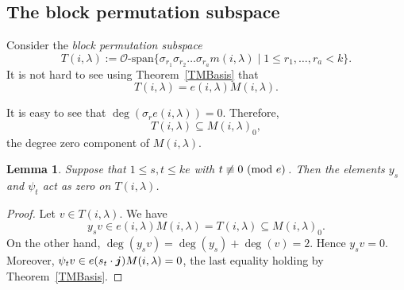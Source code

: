 \documentclass[twoside,11pt,reqno]{amsart}
\numberwithin{equation}{section}
\newtheorem{Lemma}[equation]{Lemma}
\theoremstyle{definition}  %
\newcommand\Comment[2][\relax]{\space\par\medskip\noindent%
   \fbox{\begin{minipage}{\textwidth}\textbf{Comment\ifx\relax#1\else---#1\fi}\newline%
        #2\end{minipage}}\medskip
}
\def\bj{\text{\boldmath$j$}}
\def\bs{\text{\boldmath$s$}}
\def\pmod#1{\text{ }(\text{\rm mod } #1)\,}
\newcommand{\End}{\operatorname{End}}
\newcommand{\0}{{\bar 0}}
\newcommand{\1}{{\bar 1}}
\newcommand{\la}{\lambda}
\newcommand{\si}{\sigma}
\newcommand{\de}{\delta}
\renewcommand\O{\mathcal O}
\begin{document}

\subsection{\boldmath The block permutation subspace}\label{SSBlPermSp}
Consider the {\em block permutation subspace} 
$$
T(i,\la):=\O\text{-span}\{\si_{r_1}\si_{r_2}\dots\si_{r_a}m(i,\la)\mid 1\le r_1,\dots,r_a<k\}.
$$
It is not hard to see using Theorem~\ref{TMBasis} that 
$$
T(i,\la)= e(i,\la)M(i,\la).
$$

%
It is easy to see that $\deg(\si_re(i,\la))=0$. Therefore, 
$$T(i,\la)\subseteq M(i,\la)_0,$$ 
the degree zero component of $M(i,\la)$. 

\begin{Lemma}\label{LNew}
Suppose that $1\le s, t\le ke$ with  $t\not\equiv0\pmod e$. Then the elements $y_s$ and $\psi_t$ act as zero on $T(i,\la)$.
\end{Lemma}
\begin{proof}
Let $v\in T(i,\la)$. We have 
$$y_sv\in e(i,\la)M(i,\la)=T(i,\la)\subseteq M(i,\la)_0.$$ 
On the other hand, $\deg(y_sv)=\deg(y_s)+\deg(v)=2$. Hence $y_sv=0$. Moreover, $\psi_tv\in e(s_t\cdot\bj)M(i,\la)=0$, the last equality holding by Theorem~\ref{TMBasis}. 
\end{proof}
\end{document}
